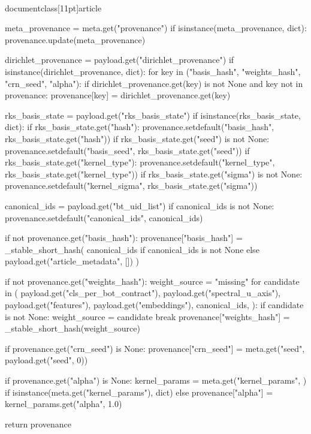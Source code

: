 \\documentclass[11pt]{article}
\begin{document}
\begin{CodeBlock}
    meta_provenance = meta.get("provenance")
    if isinstance(meta_provenance, dict):
        provenance.update(meta_provenance)

    dirichlet_provenance = payload.get("dirichlet_provenance")
    if isinstance(dirichlet_provenance, dict):
        for key in ("basis_hash", "weights_hash", "crn_seed", "alpha"):
            if dirichlet_provenance.get(key) is not None and key not in provenance:
                provenance[key] = dirichlet_provenance.get(key)

    rks_basis_state = payload.get("rks_basis_state")
    if isinstance(rks_basis_state, dict):
        if rks_basis_state.get("hash"):
            provenance.setdefault("basis_hash", rks_basis_state.get("hash"))
        if rks_basis_state.get("seed") is not None:
            provenance.setdefault("basis_seed", rks_basis_state.get("seed"))
        if rks_basis_state.get("kernel_type"):
            provenance.setdefault("kernel_type", rks_basis_state.get("kernel_type"))
        if rks_basis_state.get("sigma") is not None:
            provenance.setdefault("kernel_sigma", rks_basis_state.get("sigma"))

    canonical_ids = payload.get("bt_uid_list")
    if canonical_ids is not None:
        provenance.setdefault("canonical_ids", canonical_ids)

    if not provenance.get("basis_hash"):
        provenance["basis_hash"] = _stable_short_hash(
            canonical_ids if canonical_ids is not None else payload.get("article_metadata", [])
        )

    if not provenance.get("weights_hash"):
        weight_source = "missing"
        for candidate in (
            payload.get("cls_per_bot_contract"),
            payload.get("spectral_u_axis"),
            payload.get("features"),
            payload.get("embeddings"),
            canonical_ids,
        ):
            if candidate is not None:
                weight_source = candidate
                break
        provenance["weights_hash"] = _stable_short_hash(weight_source)

    if provenance.get("crn_seed") is None:
        provenance["crn_seed"] = meta.get("seed", payload.get("seed", 0))

    if provenance.get("alpha") is None:
        kernel_params = meta.get("kernel_params", {}) if isinstance(meta.get("kernel_params"), dict) else {}
        provenance["alpha"] = kernel_params.get("alpha", 1.0)

    return provenance



\end{CodeBlock}
\end{document}
